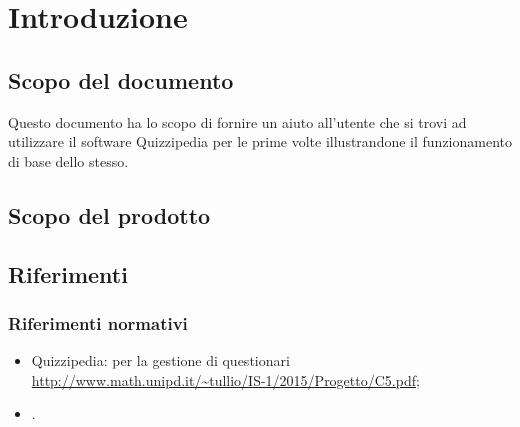 \documentclass[a4paper, titlepage]{article}
\begin{document}
	
	\pagestyle{fancy}	
	
	\maketitle
	
	
	
	\newpage
	\tableofcontents
	\newpage
	\listoffigures
	\newpage
	\listoftables\label{lastromanpage}
	
	\newpage
	\clearpage	
	\hypersetup{linkcolor=blue}
	
	\section{Introduzione}
	\subsection{Scopo del documento}
	Questo documento ha lo scopo di fornire un aiuto all'utente che si trovi ad utilizzare il software
	Quizzipedia per le prime volte illustrandone il funzionamento di base dello stesso.
	
	\subsection{Scopo del prodotto}
	\SCOPO
	
	\subsection{Riferimenti}	
	\subsubsection{Riferimenti normativi}
	\begin{itemize}
		\item {} Quizzipedia:  per la gestione di questionari \newline \url{http://www.math.unipd.it/~tullio/IS-1/2015/Progetto/C5.pdf};
		\item {} \NdPdoc.
	\end{itemize}
	\newpage
	
\end{document}
